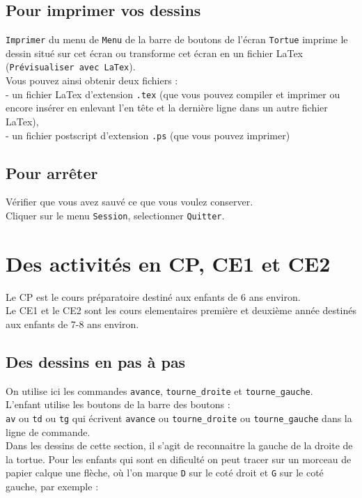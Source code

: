 \documentclass[a4paper,11pt]{book}
\begin{document}
\section{Pour imprimer vos dessins}
{\tt Imprimer} du menu de {\tt Menu} de la barre de boutons de l'\'ecran 
{\tt Tortue} imprime le dessin situ\'e sur cet \'ecran ou transforme cet 
\'ecran en un fichier LaTex ({\tt Pr\'evisualiser avec LaTex}).\\ 
Vous pouvez ainsi obtenir deux fichiers :\\
-  un fichier LaTex d'extension {\tt .tex} (que vous pouvez compiler et 
imprimer ou encore ins\'erer en enlevant l'en t\^ete et la 
derni\`ere ligne dans un autre fichier LaTex),\\
- un fichier postscript d'extension {\tt .ps} (que vous pouvez imprimer)


\section{Pour arr\^eter}
V\'erifier que vous avez sauv\'e ce que vous voulez conserver.\\
Cliquer sur le menu {\tt Session}, selectionner  {\tt Quitter}. 


\chapter{Des activit\'es en CP, CE1 et CE2}
Le CP est le cours pr\'eparatoire destin\'e aux enfants de 6 ans environ.\\
Le CE1 et le CE2 sont les cours elementaires premi\`ere et deuxi\`eme ann\'ee
destin\'es aux enfants de 7-8 ans environ.
\section{Des dessins en pas \`a pas}
On utilise ici les commandes {\tt avance}, {\tt tourne\_droite} et 
{\tt tourne\_gauche}. \\
L'enfant utilise les boutons de la barre des boutons :\\
{\tt av} ou  {\tt td} ou {\tt tg} qui \'ecrivent {\tt avance} ou
{\tt tourne\_droite} ou {\tt tourne\_gauche} dans la ligne de commande.\\
Dans les dessins de cette section, il s'agit de reconnaitre la gauche de la 
droite de la tortue. Pour les enfants qui sont en dificult\'e on peut tracer 
sur un morceau de papier calque une fl\`eche, o\`u l'on marque {\tt D} sur le
cot\'e droit et {\tt G} sur le cot\'e gauche, par exemple :
\end{document}
